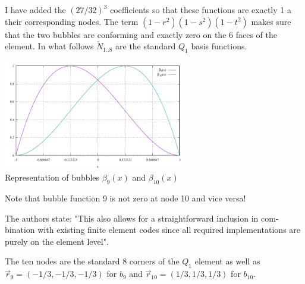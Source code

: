 I have added the $(27/32)^3$ coefficients so that these functions are exactly 1 a their 
corresponding nodes.
The term $(1-r^2)(1-s^2)(1-t^2)$ makes sure that the two bubbles are conforming and exactly zero 
on the 6 faces of the element.
In what follows $\tilde{N}_{1..8}$ are the standard $Q_1$ basis functions.

\begin{center}
\includegraphics[width=8cm]{images/MINI3D/bubbles.pdf}\\
{\captionfont Representation of bubbles $\beta_9(x)$ and $\beta_{10}(x)$}
\end{center}

Note that bubble function 9 is not zero at node 10 and vice versa!

The authors state: "This also allows for a straightforward inclusion in com-
bination with existing finite element codes since all required
implementations are purely on the element level". 


The ten nodes are the standard 8 corners of the $Q_1$ element as well 
as $\vec{r}_9=(-1/3,-1/3,-1/3)$ for $b_9$ and $\vec{r}_{10}=(1/3,1/3,1/3)$ for $b_{10}$.


